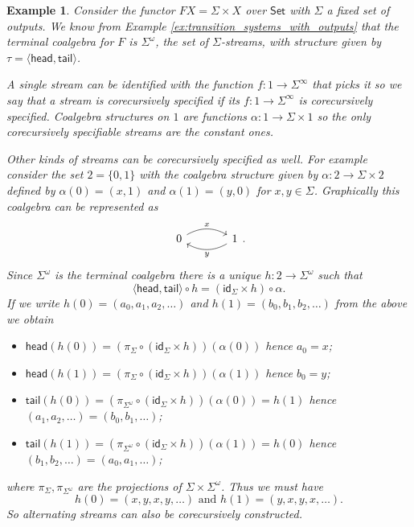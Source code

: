 \documentclass[letterpaper, 11pt, oneside]{memoir}
\theoremstyle{myteo}
\newtheorem{example}[theorem]{Example}
\numberwithin{equation}{section}
\newcommand{\id}{\textsf{id}}
\newcommand{\head}{\textsf{head}}
\newcommand{\tail}{\textsf{tail}}
\newcommand{\Set}{\textsf{Set}}
\newcommand{\intoprod}[2]{{\langle #1, #2\rangle}}
\begin{document}
\begin{example}
  Consider the functor \(FX = \Sigma \times X\) over \(\Set\) with \(\Sigma\) a fixed set of outputs.
  We know from Example \ref{ex:transition_systems_with_outputs} that the terminal coalgebra for \(F\) is \(\Sigma^\omega\), the set of \(\Sigma\)-streams, with structure given by \(\tau = \intoprod{\head}{\tail}\).

  A single stream can be identified with the function \(f : 1 \to \Sigma^\infty\) that picks it so we say that a stream is corecursively specified if its \(f : 1 \to \Sigma^\infty\) is corecursively specified.
  Coalgebra structures on \(1\) are functions \(\alpha: 1 \to \Sigma \times 1\) so the only corecursively specifiable streams are the constant ones.

  Other kinds of streams can be corecursively specified as well.
  For example consider the set \(2 = \{0, 1\}\) with the coalgebra structure given by \(\alpha : 2 \to \Sigma \times 2\) defined by \(\alpha(0) = (x, 1)\) and \(\alpha(1) = (y, 0)\) for \(x, y \in \Sigma\).
  Graphically this coalgebra can be represented as
  \begin{equation*}
    \begin{tikzcd}[sep = large]
      0 \ar[r, bend left, "x"] & 1 \ar[l, bend left, "y"]
    \end{tikzcd}.
  \end{equation*}
  Since \(\Sigma^\omega\) is the terminal coalgebra there is a unique \(h : 2 \to \Sigma^\omega\) such that
  \begin{equation*}
    \intoprod{\head}{\tail} \circ h = (\id_\Sigma \times h) \circ \alpha.
  \end{equation*}
  If we write \(h(0) = (a_0, a_1, a_2, \ldots)\) and \(h(1) = (b_0, b_1, b_2, \ldots)\) from the above we obtain
  \begin{itemize}
  \item[1.] \(\head(h(0)) = (\pi_\Sigma \circ (\id_\Sigma \times h))(\alpha(0))\) hence \(a_0 = x\);
  \item[2.] \(\head(h(1)) = (\pi_\Sigma \circ (\id_\Sigma \times h))(\alpha(1))\) hence \(b_0 = y\);
  \item[3.] \(\tail(h(0)) = (\pi_{\Sigma^\omega} \circ (\id_\Sigma \times h))(\alpha(0)) = h(1)\) hence \((a_1, a_2, \ldots) = (b_0, b_1, \ldots)\);
  \item[4.] \(\tail(h(1)) = (\pi_{\Sigma^\omega} \circ (\id_\Sigma \times h))(\alpha(1)) = h(0)\) hence \((b_1, b_2, \ldots) = (a_0, a_1, \ldots)\);
  \end{itemize}
  where \(\pi_\Sigma, \pi_{\Sigma^\omega}\) are the projections of \(\Sigma \times \Sigma^\omega\).
  Thus we must have
  \begin{equation*}
    h(0) = (x, y, x, y, \ldots) \text{ and } h(1) = (y, x, y, x, \ldots).
  \end{equation*}
  So alternating streams can also be corecursively constructed.


\end{example}
\end{document}
